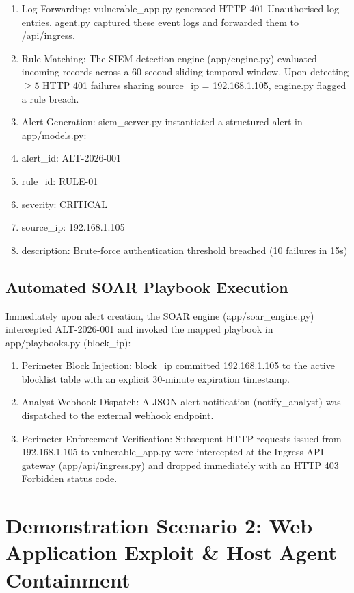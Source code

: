 \begin{enumerate}
  \item Log Forwarding: vulnerable\_app.py generated HTTP 401 Unauthorised log entries. agent.py captured these event logs and forwarded them to /api/ingress.
  \item Rule Matching: The SIEM detection engine (app/engine.py) evaluated incoming records across a 60-second sliding temporal window. Upon detecting $\ge 5$ HTTP 401 failures sharing source\_ip = 192.168.1.105, engine.py flagged a rule breach.
  \item Alert Generation: siem\_server.py instantiated a structured alert in app/models.py:
  \item alert\_id: ALT-2026-001
  \item rule\_id: RULE-01
  \item severity: CRITICAL
  \item source\_ip: 192.168.1.105
  \item description: Brute-force authentication threshold breached (10 failures in 15s)
\end{enumerate}

\subsection{Automated SOAR Playbook Execution}

Immediately upon alert creation, the SOAR engine (app/soar\_engine.py) intercepted ALT-2026-001 and invoked the mapped playbook in app/playbooks.py (block\_ip):

\begin{enumerate}
  \item Perimeter Block Injection: block\_ip committed 192.168.1.105 to the active blocklist table with an explicit 30-minute expiration timestamp.
  \item Analyst Webhook Dispatch: A JSON alert notification (notify\_analyst) was dispatched to the external webhook endpoint.
  \item Perimeter Enforcement Verification: Subsequent HTTP requests issued from 192.168.1.105 to vulnerable\_app.py were intercepted at the Ingress API gateway (app/api/ingress.py) and dropped immediately with an HTTP 403 Forbidden status code.
\end{enumerate}

\section{Demonstration Scenario 2: Web Application Exploit \& Host Agent Containment}


